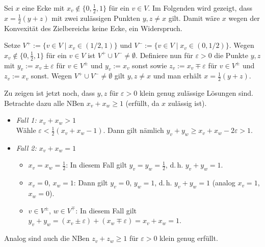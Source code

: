 \begin{Beweis}
    Sei $x$ eine Ecke mit $x_v \notin \{0, \frac{1}{2}, 1\}$ für ein $v \in V$.
    Im Folgenden wird gezeigt, dass $x = \frac{1}{2} (y + z)$ mit
    zwei zulässigen Punkten $y, z \not= x$ gilt.
    Damit wäre $x$ wegen der Konvexität des Zielbereichs keine Ecke, ein Widerspruch.
    
    Setze $V^+ := \{v \in V \;|\; x_v \in (1/2, 1)\}$ und
    $V^- := \{v \in V \;|\; x_v \in (0, 1/2)\}$.
    Wegen $x_v \notin \{0, \frac{1}{2}, 1\}$ für ein $v \in V$
    ist $V^+ \cup V^- \not= \emptyset$.
    Definiere nun für $\varepsilon > 0$ die Punkte
    $y, z$ mit $y_v := x_v \pm \varepsilon$ für $v \in V^\pm$ und $y_v := x_v$ sonst sowie
    $z_v := x_v \mp \varepsilon$ für $v \in V^\pm$ und $z_v := x_v$ sonst.
    Wegen $V^+ \cup V^- \not= \emptyset$ gilt $y, z \not= x$ und man erhält
    $x = \frac{1}{2} (y + z)$.
    
    Zu zeigen ist jetzt noch, dass $y, z$ für $\varepsilon > 0$ klein genug
    zulässige Lösungen sind.
    Betrachte dazu alle NBen $x_v + x_w \ge 1$
    (erfüllt, da $x$ zulässig ist).
    \begin{itemize}
        \item
        \emph{Fall 1: $x_v + x_w > 1$}\\
        Wähle $\varepsilon < \frac{1}{2} (x_v + x_w - 1)$.
        Dann gilt nämlich $y_v + y_w \ge x_v + x_w - 2\varepsilon > 1$.
        
        \item
        \emph{Fall 2: $x_v + x_w = 1$}
        \begin{itemize}
            \item
            $x_v = x_w = \frac{1}{2}$:
            In diesem Fall gilt $y_v = y_w = \frac{1}{2}$, d.\,h. $y_v + y_w = 1$.
            
            \item
            $x_v = 0$, $x_w = 1$:
            Dann gilt $y_v = 0$, $y_w = 1$, d.\,h. $y_v + y_w = 1$
            (analog $x_v = 1$, $x_w = 0$).
            
            
            \item
            $v \in V^\pm$, $w \in V^\mp$:
            In diesem Fall gilt
            $y_v + y_w = (x_v \pm \varepsilon) + (x_w \mp \varepsilon) = x_v + x_w = 1$.
        \end{itemize}
    \end{itemize}
    Analog sind auch die NBen $z_v + z_w \ge 1$ für $\varepsilon > 0$ klein genug erfüllt.
\end{Beweis}

